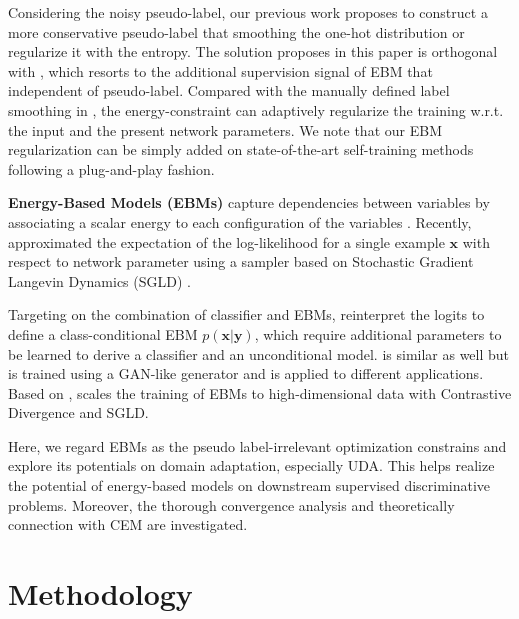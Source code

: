 \documentclass[a4paper,conference]{IEEEtran}
\theoremstyle{plain}%
\begin{document}
Considering the noisy pseudo-label, our previous work \cite{zou2019confidence} proposes to construct a more conservative pseudo-label that smoothing the one-hot distribution or regularize it with the entropy. The solution proposes in this paper is orthogonal with \cite{zou2019confidence}, which resorts to the additional supervision signal of EBM that independent of pseudo-label. Compared with the manually defined label smoothing in \cite{zou2019confidence}, the energy-constraint can adaptively regularize the training w.r.t. the input and the present network parameters. We note that our EBM regularization can be simply added on state-of-the-art self-training methods following a plug-and-play fashion. \vspace{+5pt}







\noindent\textbf{Energy-Based Models (EBMs)} capture dependencies between variables by associating a scalar energy to each configuration of the variables \cite{lecun2006tutorial}. Recently, \cite{nijkamp2019learning,grathwohl2019your} approximated the expectation of the log-likelihood for a single example $\mathbf{x}$ with respect to network parameter using a sampler based on Stochastic Gradient Langevin Dynamics (SGLD) \cite{welling2011bayesian}.



Targeting on the combination of classifier and EBMs, \cite{xie2016theory,du2019implicit} reinterpret the logits to define a class-conditional EBM $p(\mathbf{x}|\mathbf{y})$, which require additional parameters to be learned to derive a classifier and an unconditional model. \cite{song2018learning} is similar as well but is trained using a GAN-like generator and is applied to different applications. Based on \cite{nijkamp2019learning}, \cite{grathwohl2019your} scales the training of EBMs to high-dimensional data with Contrastive Divergence and SGLD. 

Here, we regard EBMs as the pseudo label-irrelevant optimization constrains and explore its potentials on domain adaptation, especially UDA. This helps realize the potential of energy-based models on downstream supervised discriminative problems. Moreover, the thorough convergence analysis and theoretically connection with CEM are investigated.  






\section{Methodology}
\end{document}
